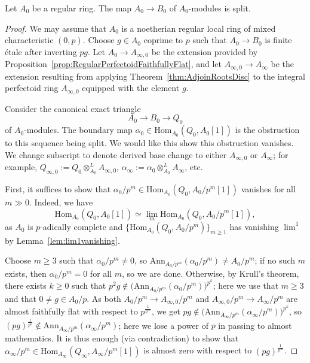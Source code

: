 \documentclass[10pt,reqno]{amsart}
\begin{document}
\begin{theorem}
\label{thm:DSC}
Let $A_0$ be a regular ring. The map $A_0 \to B_0$ of $A_0$-modules is split.
\end{theorem}
\begin{proof}
We may assume that $A_0$ is a noetherian regular local ring of mixed characteristic $(0,p)$. Choose $g \in A_0$ coprime to $p$ such that $A_0 \to B_0$ is finite \'etale after inverting $pg$. Let $A_0 \to A_{\infty,0}$ be the extension provided by Proposition~\ref{prop:RegularPerfectoidFaithfullyFlat}, and let $A_{\infty,0} \to A_\infty$ be the extension resulting from applying Theorem~\ref{thm:AdjoinRootsDisc} to the integral perfectoid ring $A_{\infty,0}$ equipped with the element $g$.


Consider the canonical exact triangle 
\[ A_0 \to B_0 \to Q_0\]
of $A_0$-modules. The boundary map $\alpha_0 \in \mathrm{Hom}_{A_0}(Q_0, A_0[1])$ is the obstruction to this sequence being split. We would like this show this obstruction vanishes. We change subscript to denote derived base change to either $A_{\infty,0}$ or $A_{\infty}$; for example, $Q_{\infty,0} := Q_0 \otimes_{A_0}^L A_{\infty,0}$, $\alpha_\infty := \alpha_0 \otimes_{A_0}^L A_\infty$, etc.

First, it suffices to show that $\alpha_0/p^m \in \mathrm{Hom}_{A_0}(Q_0, A_0/p^m[1])$ vanishes for all $m \gg 0$. Indeed, we have 
\[ \mathrm{Hom}_{A_0}(Q_0, A_0[1]) \simeq \lim_m \mathrm{Hom}_{A_0}(Q_0, A_0/p^m[1]),\]
as $A_0$ is $p$-adically complete and $\{\mathrm{Hom}_{A_0}(Q_0, A_0/p^m)\}_{m \geq 1}$ has vanishing $\lim^1$ by Lemma~\ref{lem:lim1vanishing}.

Choose  $m \geq 3$ such that $\alpha_0/p^m \neq 0$, so $\mathrm{Ann}_{A_0/p^m}(\alpha_0/p^m) \neq A_0/p^m$; if no such $m$ exists, then $\alpha_0/p^m = 0$ for all $m$, so we are done. Otherwise, by Krull's theorem, there exists $k \geq 0$ such that $p^2 g \notin \big(\mathrm{Ann}_{A_0/p^m}(\alpha_0/p^m)\big)^{p^k}$; here we use that $m \geq 3$ and that $0 \neq g \in A_0/p$. As both $A_0/p^m \to A_{\infty,0}/p^m$ and $A_{\infty,0}/p^m \to A_\infty/p^m$ are almost faithfully flat with respect to $p^{\frac{1}{p^\infty}}$, we get $pg \notin \big(\mathrm{Ann}_{A_\infty/p^m}(\alpha_\infty/p^m)\big)^{p^k}$, so $(pg)^{\frac{1}{p^k}} \notin \mathrm{Ann}_{A_\infty/p^m}(\alpha_\infty/p^m)$; here we lose a power of $p$ in passing to almost mathematics. It is thus enough (via contradiction) to show that $\alpha_\infty/p^m \in \mathrm{Hom}_{A_\infty}(Q_\infty, A_\infty/p^m[1])$ is almost zero with respect to $(pg)^{\frac{1}{p^\infty}}$. 


\end{proof}
\end{document}
